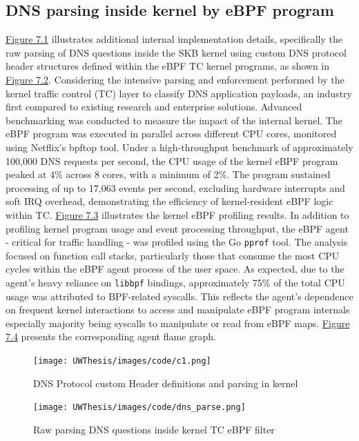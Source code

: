 \documentclass [11pt, proquest] {uwthesis}[2020/02/24]
\begin{document}
\subsection{DNS parsing inside kernel by eBPF  program}
\hyperref[fig:c1]{Figure 7.1} illustrates additional internal implementation details, specifically the raw parsing of DNS questions inside the SKB kernel using custom DNS protocol header structures defined within the eBPF TC kernel programs, as shown in \hyperref[fig:c2]{Figure 7.2}. Considering the intensive parsing and enforcement performed by the kernel traffic control (TC) layer to classify DNS application payloads, an industry first compared to existing research and enterprise solutions. Advanced benchmarking was conducted to measure the impact of the internal kernel. The eBPF program was executed in parallel across different CPU cores, monitored using Netflix’s bpftop tool. Under a high-throughput benchmark of approximately 100,000 DNS requests per second, the CPU usage of the kernel eBPF program peaked at 4\% across 8 cores, with a minimum of 2\%. The program sustained processing of up to 17,063 events per second, excluding hardware interrupts and soft IRQ overhead, demonstrating the efficiency of kernel-resident eBPF logic within TC. \hyperref[fig:c3]{Figure 7.3} illustrates the kernel eBPF profiling results. In addition to profiling kernel program usage and event processing throughput, the eBPF agent - critical for traffic handling - was profiled using the Go \texttt{pprof} tool. The analysis focused on function call stacks, particularly those that consume the most CPU cycles within the eBPF agent process of the user space. As expected, due to the agent’s heavy reliance on \texttt{libbpf} bindings, approximately 75\% of the total CPU usage was attributed to BPF-related syscalls. This reflects the agent’s dependence on frequent kernel interactions to access and manipulate eBPF program internals especially majority being syscalls to manipulate or read from eBPF maps. \hyperref[fig:c4]{Figure 7.4} presents the corresponding agent flame graph. 

\begin{figure}
    \centering
  \texttt{[image: UWThesis/images/code/c1.png]}
  \caption{DNS Protocol custom Header definitions and parsing in kernel}
  \label{fig:c1}
\end{figure}


\begin{figure}[H]
    \centering
    \texttt{[image: UWThesis/images/code/dns\_parse.png]}
    \caption{Raw parsing DNS questions inside kernel TC eBPF filter}
    \label{fig:c2}
\end{figure}
\end{document}
